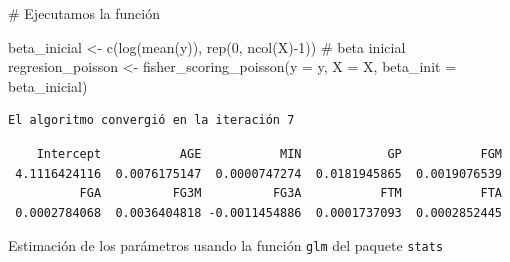 \documentclass[
  letterpaper,
  DIV=11,
  numbers=noendperiod]{scrartcl}
\newenvironment{Shaded}{\begin{snugshade}}{\end{snugshade}}
\newcommand{\AttributeTok}[1]{\textcolor[rgb]{0.40,0.45,0.13}{#1}}
\newcommand{\CommentTok}[1]{\textcolor[rgb]{0.37,0.37,0.37}{#1}}
\newcommand{\DecValTok}[1]{\textcolor[rgb]{0.68,0.00,0.00}{#1}}
\newcommand{\FunctionTok}[1]{\textcolor[rgb]{0.28,0.35,0.67}{#1}}
\newcommand{\NormalTok}[1]{\textcolor[rgb]{0.00,0.23,0.31}{#1}}
\newcommand{\OtherTok}[1]{\textcolor[rgb]{0.00,0.23,0.31}{#1}}
\newcommand{\SpecialCharTok}[1]{\textcolor[rgb]{0.37,0.37,0.37}{#1}}
\newcommand{\StringTok}[1]{\textcolor[rgb]{0.13,0.47,0.30}{#1}}
\begin{document}
\begin{Shaded}
\begin{Highlighting}[]
\CommentTok{\# Ejecutamos la función}

\NormalTok{beta\_inicial }\OtherTok{\textless{}{-}} \FunctionTok{c}\NormalTok{(}\FunctionTok{log}\NormalTok{(}\FunctionTok{mean}\NormalTok{(y)), }\FunctionTok{rep}\NormalTok{(}\DecValTok{0}\NormalTok{, }\FunctionTok{ncol}\NormalTok{(X)}\SpecialCharTok{{-}}\DecValTok{1}\NormalTok{)) }\CommentTok{\# beta inicial}
\NormalTok{regresion\_poisson }\OtherTok{\textless{}{-}} \FunctionTok{fisher\_scoring\_poisson}\NormalTok{(}\AttributeTok{y =}\NormalTok{ y, }\AttributeTok{X =}\NormalTok{ X, }\AttributeTok{beta\_init =}\NormalTok{ beta\_inicial)}
\end{Highlighting}
\end{Shaded}

\begin{verbatim}
El algoritmo convergió en la iteración 7
\end{verbatim}

\begin{Shaded}
\end{Shaded}

\begin{verbatim}
    Intercept           AGE           MIN            GP           FGM 
 4.1116424116  0.0076175147  0.0000747274  0.0181945865  0.0019076539 
          FGA          FG3M          FG3A           FTM           FTA 
 0.0002784068  0.0036404818 -0.0011454886  0.0001737093  0.0002852445 
\end{verbatim}

Estimación de los parámetros usando la función \texttt{glm} del paquete
\texttt{stats}
\end{document}
